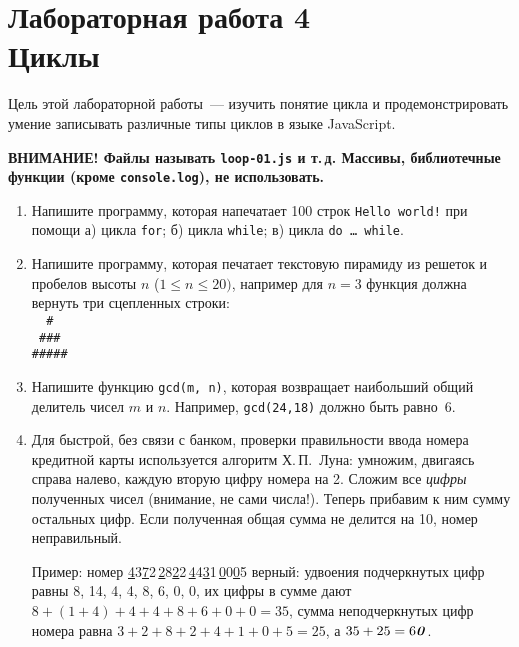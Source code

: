\documentclass{article}
\begin{document}
\section*{{\normalsize Лабораторная работа 4} \\Циклы}

Цель этой лабораторной работы~--- изучить понятие цикла и продемонстрировать умение записывать различные типы циклов в языке JavaScript. 

\bigskip
\noindent\textbf{ВНИМАНИЕ! Файлы называть \texttt{loop-01.js} и т.\,д. Массивы, библиотечные функции (кроме \texttt{console.log}), не использовать.
}
\bigskip\sloppy

\begin{enumerate}
\item
Напишите программу, которая напечатает 100 строк \texttt{Hello world!} 
при помощи а) цикла \texttt{for}; б) цикла \texttt{while}; в) цикла \texttt{do \ldots\ while}.

\item
Напишите программу, которая печатает текстовую пирамиду из решеток и пробелов высоты $n$ ($1\leqslant n \leqslant 20)$, например для $n=3$ функция должна вернуть три сцепленных строки:\\
\verb!  #!\\
\verb! ###!\\
\verb!#####!\\
\item
Напишите функцию \texttt{gcd(m, n)}, которая возвращает наибольший общий делитель чисел $m$ и $n$. Например,  \texttt{gcd(24,18)} должно быть равно~$6$.

\item
Для быстрой, без связи с банком, проверки правильности ввода номера кредитной карты используется алгоритм Х.\,П.~Луна: умножим, двигаясь справа налево, каждую вторую цифру номера на 2. Сложим все \emph{цифры} полученных чисел (внимание, не сами числа!). Теперь прибавим к ним сумму остальных цифр. Если полученная общая сумма не делится на 10, номер неправильный. 

Пример: номер \underline{4}3\underline{7}2\,\underline{2}8\underline{2}2\,\underline{4}4\underline{3}1\,\underline{0}0\underline{0}5 верный: удвоения подчеркнутых цифр равны 8, 14, 4, 4, 8, 6, 0, 0, их цифры в сумме дают $8 + (1\!+\!4) + 4 + 4+ 8+ 6 + 0+ 0 = 35$, сумма неподчеркнутых цифр номера равна $3+2+8+2+4+1+0+5=25$, а $35+25=6\mbox{\textbf{\textit{0}}}$.


\end{enumerate}
\end{document}
